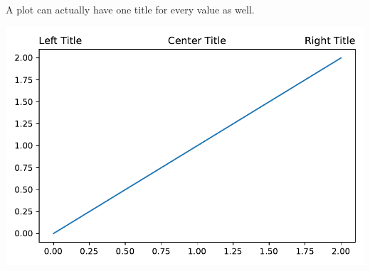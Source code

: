 A plot can actually have one title for every  value as well. 


\begin{center}
    \includegraphics[width = .7\textwidth]{figures/proseplots/title-loc.pdf}
\end{center}


